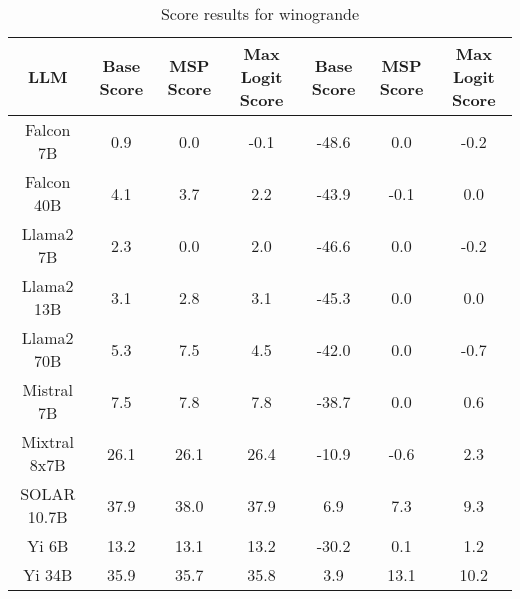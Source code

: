 \renewcommand\arraystretch{1.2}
\begin{table*}
\centering
\begin{tabular}{c|c|c|c|c|c|c}
LLM & Base Score & MSP Score & Max Logit Score & Base Score & MSP Score & Max Logit Score\\ \hline
Falcon 7B & 0.9 & 0.0 & -0.1 & -48.6 & 0.0 & -0.2\\
Falcon 40B & 4.1 & 3.7 & 2.2 & -43.9 & -0.1 & 0.0\\
Llama2 7B & 2.3 & 0.0 & 2.0 & -46.6 & 0.0 & -0.2\\
Llama2 13B & 3.1 & 2.8 & 3.1 & -45.3 & 0.0 & 0.0\\
Llama2 70B & 5.3 & 7.5 & 4.5 & -42.0 & 0.0 & -0.7\\
Mistral 7B & 7.5 & 7.8 & 7.8 & -38.7 & 0.0 & 0.6\\
Mixtral 8x7B & 26.1 & 26.1 & 26.4 & -10.9 & -0.6 & 2.3\\
SOLAR 10.7B & 37.9 & 38.0 & 37.9 & 6.9 & 7.3 & 9.3\\
Yi 6B & 13.2 & 13.1 & 13.2 & -30.2 & 0.1 & 1.2\\
Yi 34B & 35.9 & 35.7 & 35.8 & 3.9 & 13.1 & 10.2\\
\hline
\end{tabular}
\caption{Score results for winogrande}
\end{table*}
\label{tab:winogrande_score}
